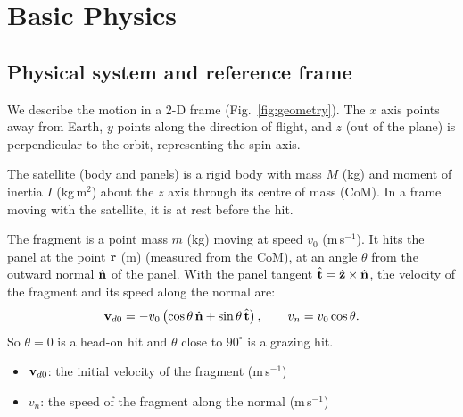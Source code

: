 \newpage
\section{Basic Physics}
\label{sec:basic-physics}

\subsection{Physical system and reference frame}

We describe the motion in a 2-D frame (Fig.~\ref{fig:geometry}).
The $x$ axis points away from Earth, $y$ points along the direction of
flight, and $z$ (out of the plane) is perpendicular to the orbit, representing the spin axis.

The satellite (body and panels) is a rigid body with mass $M$ (kg) and moment
of inertia $I$ (kg\,m$^2$) about the $z$ axis through its centre of mass (CoM). In a frame
moving with the satellite, it is at rest before the hit.

The fragment is a point mass $m$ (kg) moving at speed $v_0$ (m\,s$^{-1}$). It hits
the panel at the point $\mathbf{r}$ (m) (measured from the CoM), at an angle
$\theta$ from the outward normal $\hat{\mathbf{n}}$ of the panel. With the
panel tangent $\hat{\mathbf{t}}=\hat{\mathbf{z}}\times\hat{\mathbf{n}}$, the
velocity of the fragment and its speed along the normal are:
\begin{equation}
  \mathbf{v}_{d0}=-v_0\left(\cos\theta\,\hat{\mathbf{n}}+\sin\theta\,\hat{\mathbf{t}}\right),
  \qquad v_n=v_0\cos\theta .
  \label{eq:vd0}
\end{equation}
So $\theta=0$ is a head-on hit and $\theta$ close to $90^\circ$ is a
grazing hit.

\begin{itemize}
  \item $\mathbf{v}_{d0}$: the initial velocity of the fragment (m\,s$^{-1}$)
  \item $v_n$: the speed of the fragment along the normal (m\,s$^{-1}$)
\end{itemize}

